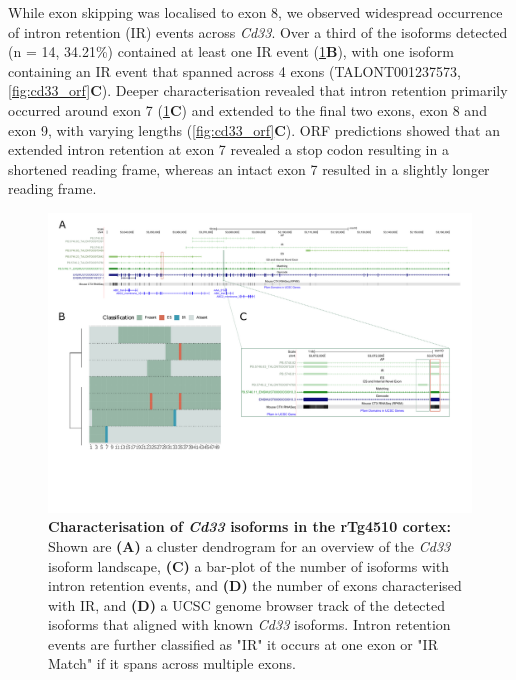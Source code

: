 While exon skipping was localised to exon 8, we observed widespread occurrence of intron retention (IR) events across \textit{Cd33}. Over a third of the isoforms detected (n = 14, 34.21\%) contained at least one IR event (\cref{fig:cd33}\textbf{B}), with one isoform containing an IR event that spanned across 4 exons (TALONT001237573, \cref{fig:cd33_orf}\textbf{C}). Deeper characterisation revealed that intron retention primarily occurred around exon 7 (\cref{fig:cd33}\textbf{C}) and extended to the final two exons, exon 8 and exon 9, with varying lengths (\cref{fig:cd33_orf}\textbf{C}). ORF predictions showed that an extended intron retention at exon 7 revealed a stop codon resulting in a shortened reading frame, whereas an intact exon 7 resulted in a slightly longer reading frame.

\begin{landscape}
	\begin{figure}[htp]
		\centering
		\captionsetup{width=1.3\textwidth}
		\includegraphics[page=4,trim={0 3cm 0 0},scale = 0.85]{Figures/TargetGenes_Annotation_Landscape.pdf}
		\caption[Characterisation of \textit{Cd33} isoforms in the rTg4510 cortex]%
		{\textbf{Characterisation of \textit{Cd33} isoforms in the rTg4510 cortex:} Shown are \textbf{(A)} a cluster dendrogram for an overview of the \textit{Cd33} isoform landscape, \textbf{(C)} a bar-plot of the number of isoforms with intron retention events, and \textbf{(D)} the number of exons characterised with IR, and \textbf{(D)} a UCSC genome browser track of the detected isoforms that aligned with known \textit{Cd33} isoforms. Intron retention events are further classified as "IR" it occurs at one exon or "IR Match" if it spans across multiple exons.}    
		\label{fig:cd33}
	\end{figure}
\end{landscape}

